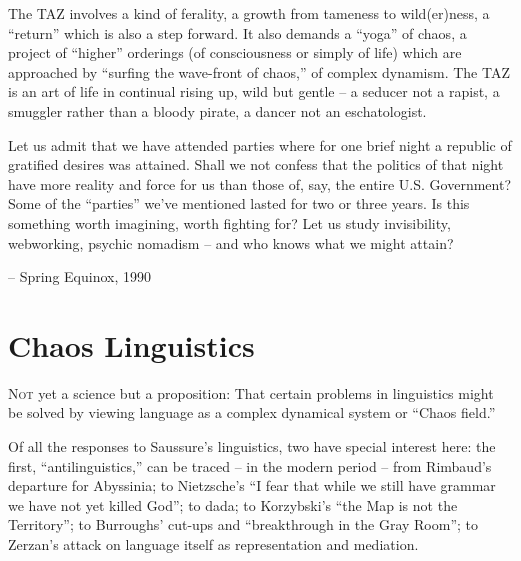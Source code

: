 \documentclass[a4paper,english,10pt,twoside]{article}
\begin{document}
\medskip
The TAZ involves a kind of ferality, a growth from tameness to wild(er)ness, a \enquote{return} which is also a step forward. It also demands a \enquote{yoga} of chaos, a project of \enquote{higher} orderings (of consciousness or simply of life) which are approached by \enquote{surfing the wave-front of chaos,} of complex dynamism. The TAZ is an art of life in continual rising up, wild but gentle -- a seducer not a rapist, a smuggler rather than a bloody pirate, a dancer not an eschatologist.

\medskip
Let us admit that we have attended parties where for one brief night a republic of gratified desires was attained. Shall we not confess that the politics of that night have more reality and force for us than those of, say, the entire U.S. Government? Some of the \enquote{parties} we've mentioned lasted for two or three years. Is this something worth imagining, worth fighting for? Let us study invisibility, webworking, psychic nomadism -- and who knows what we might attain?

        \begin{flushright}
        -- Spring Equinox, 1990
        \end{flushright}

\appendix
\section{Chaos Linguistics}

\lettrine{N}{ot} yet a science but a proposition: That certain problems in linguistics might be solved by viewing language as a complex dynamical system or \enquote{Chaos field.}

\medskip
Of all the responses to Saussure's linguistics, two have special interest here: the first, \enquote{antilinguistics,} can be traced -- in the modern period -- from Rimbaud's departure for Abyssinia; to Nietzsche's \enquote{I fear that while we still have grammar we have not yet killed God}; to dada; to Korzybski's \enquote{the Map is not the Territory}; to Burroughs' cut-ups and \enquote{breakthrough in the Gray Room}; to Zerzan's attack on language itself as representation and mediation.
\end{document}
